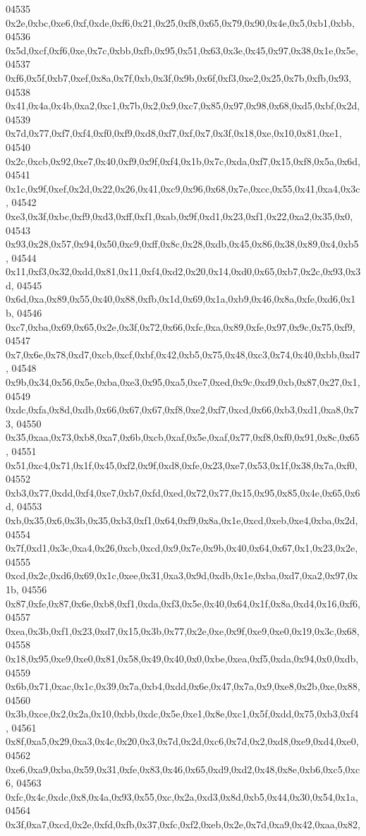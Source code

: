 \begin{DoxyCode}
04535   0x2e,0xbc,0xe6,0xf,0xde,0xf6,0x21,0x25,0xf8,0x65,0x79,0x90,0x4e,0x5,0xb1,0xbb,
04536   0x5d,0xcf,0xf6,0xe,0x7c,0xbb,0xfb,0x95,0x51,0x63,0x3e,0x45,0x97,0x38,0x1e,0x5e,
04537   0xf6,0x5f,0xb7,0xef,0x8a,0x7f,0xb,0x3f,0x9b,0x6f,0xf3,0xe2,0x25,0x7b,0xfb,0x93,
04538   0x41,0x4a,0x4b,0xa2,0xc1,0x7b,0x2,0x9,0xc7,0x85,0x97,0x98,0x68,0xd5,0xbf,0x2d,
04539   0x7d,0x77,0xf7,0xf4,0xf0,0xf9,0xd8,0xf7,0xf,0x7,0x3f,0x18,0xe,0x10,0x81,0xe1,
04540   0x2c,0xcb,0x92,0xe7,0x40,0xf9,0x9f,0xf4,0x1b,0x7c,0xda,0xf7,0x15,0xf8,0x5a,0x6d,
04541   0x1c,0x9f,0xef,0x2d,0x22,0x26,0x41,0xc9,0x96,0x68,0x7e,0xcc,0x55,0x41,0xa4,0x3c,
04542   0xe3,0x3f,0xbc,0xf9,0xd3,0xff,0xf1,0xab,0x9f,0xd1,0x23,0xf1,0x22,0xa2,0x35,0x0,
04543   0x93,0x28,0x57,0x94,0x50,0xc9,0xff,0x8c,0x28,0xdb,0x45,0x86,0x38,0x89,0x4,0xb5,
04544   0x11,0xf3,0x32,0xdd,0x81,0x11,0xf4,0xd2,0x20,0x14,0xd0,0x65,0xb7,0x2c,0x93,0x3d,
04545   0x6d,0xa,0x89,0x55,0x40,0x88,0xfb,0x1d,0x69,0x1a,0xb9,0x46,0x8a,0xfe,0xd6,0x1b,
04546   0xc7,0xba,0x69,0x65,0x2e,0x3f,0x72,0x66,0xfc,0xa,0x89,0xfe,0x97,0x9c,0x75,0xf9,
04547   0x7,0x6e,0x78,0xd7,0xcb,0xcf,0xbf,0x42,0xb5,0x75,0x48,0xc3,0x74,0x40,0xbb,0xd7,
04548   0x9b,0x34,0x56,0x5e,0xba,0xe3,0x95,0xa5,0xe7,0xed,0x9c,0xd9,0xb,0x87,0x27,0x1,
04549   0xdc,0xfa,0x8d,0xdb,0x66,0x67,0x67,0xf8,0xe2,0xf7,0xcd,0x66,0xb3,0xd1,0xa8,0x73,
04550   0x35,0xaa,0x73,0xb8,0xa7,0x6b,0xcb,0xaf,0x5e,0xaf,0x77,0xf8,0xf0,0x91,0x8c,0x65,
04551   0x51,0xc4,0x71,0x1f,0x45,0xf2,0x9f,0xd8,0xfe,0x23,0xe7,0x53,0x1f,0x38,0x7a,0xf0,
04552   0xb3,0x77,0xdd,0xf4,0xe7,0xb7,0xfd,0xed,0x72,0x77,0x15,0x95,0x85,0x4e,0x65,0x6d,
04553   0xb,0x35,0x6,0x3b,0x35,0xb3,0xf1,0x64,0xf9,0x8a,0x1e,0xcd,0xeb,0xe4,0xba,0x2d,
04554   0x7f,0xd1,0x3c,0xa4,0x26,0xcb,0xcd,0x9,0x7e,0x9b,0x40,0x64,0x67,0x1,0x23,0x2e,
04555   0xcd,0x2c,0xd6,0x69,0x1c,0xee,0x31,0xa3,0x9d,0xdb,0x1e,0xba,0xd7,0xa2,0x97,0x1b,
04556   0x87,0xfe,0x87,0x6e,0xb8,0xf1,0xda,0xf3,0x5e,0x40,0x64,0x1f,0x8a,0xd4,0x16,0xf6,
04557   0xea,0x3b,0xf1,0x23,0xd7,0x15,0x3b,0x77,0x2e,0xe,0x9f,0xe9,0xe0,0x19,0x3c,0x68,
04558   0x18,0x95,0xe9,0xe0,0x81,0x58,0x49,0x40,0x0,0xbe,0xea,0xf5,0xda,0x94,0x0,0xdb,
04559   0x6b,0x71,0xac,0x1c,0x39,0x7a,0xb4,0xdd,0x6e,0x47,0x7a,0x9,0xe8,0x2b,0xe,0x88,
04560   0x3b,0xce,0x2,0x2a,0x10,0xbb,0xdc,0x5e,0xe1,0x8e,0xc1,0x5f,0xdd,0x75,0xb3,0xf4,
04561   0x8f,0xa5,0x29,0xa3,0x4c,0x20,0x3,0x7d,0x2d,0xc6,0x7d,0x2,0xd8,0xe9,0xd4,0xe0,
04562   0xe6,0xa9,0xba,0x59,0x31,0xfe,0x83,0x46,0x65,0xd9,0xd2,0x48,0x8e,0xb6,0xc5,0xc6,
04563   0xfc,0x4c,0xdc,0x8,0x4a,0x93,0x55,0xc,0x2a,0xd3,0x8d,0xb5,0x44,0x30,0x54,0x1a,
04564   0x3f,0xa7,0xcd,0x2e,0xfd,0xfb,0x37,0xfc,0xf2,0xeb,0x2e,0x7d,0xa9,0x42,0xaa,0x82,

\end{DoxyCode}
